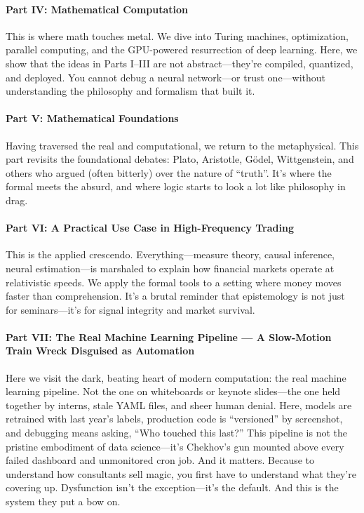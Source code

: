 \paragraph{Part IV: Mathematical Computation}
This is where math touches metal. We dive into Turing machines, optimization, parallel computing, and the GPU-powered resurrection of deep learning. Here, we show that the ideas in Parts I–III are not abstract—they’re compiled, quantized, and deployed. You cannot debug a neural network—or trust one—without understanding the philosophy and formalism that built it.

\paragraph{Part V: Mathematical Foundations}
Having traversed the real and computational, we return to the metaphysical. This part revisits the foundational debates: Plato, Aristotle, Gödel, Wittgenstein, and others who argued (often bitterly) over the nature of ``truth''. It’s where the formal meets the absurd, and where logic starts to look a lot like philosophy in drag.

\paragraph{Part VI: A Practical Use Case in High-Frequency Trading}
This is the applied crescendo. Everything—measure theory, causal inference, neural estimation—is marshaled to explain how financial markets operate at relativistic speeds. We apply the formal tools to a setting where money moves faster than comprehension. It's a brutal reminder that epistemology is not just for seminars—it's for signal integrity and market survival.

\paragraph{Part VII: The Real Machine Learning Pipeline — A Slow-Motion Train Wreck Disguised as Automation}

Here we visit the dark, beating heart of modern computation: the real machine learning pipeline. Not the one on whiteboards or keynote slides—the one held together by interns, stale YAML files, and sheer human denial. Here, models are retrained with last year’s labels, production code is “versioned” by screenshot, and debugging means asking, “Who touched this last?” This pipeline is not the pristine embodiment of data science—it’s Chekhov’s gun mounted above every failed dashboard and unmonitored cron job. And it matters. Because to understand how consultants sell magic, you first have to understand what they’re covering up. Dysfunction isn’t the exception—it’s the default. And this is the system they put a bow on.

